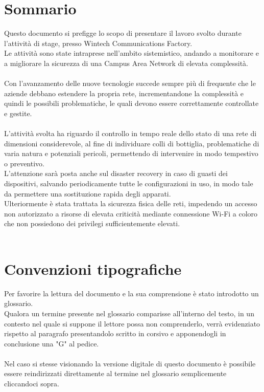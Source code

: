 \documentclass[Tesi.tex]{subfiles}
\begin{document}
\clearpage\thispagestyle{empty}
	
\renewcommand{\chaptername}{}
\renewcommand{\thechapter}{}
\chapter{Sommario}
Questo documento si prefigge lo scopo di presentare il lavoro svolto durante l'attività di stage, presso Wintech Communications Factory. \\
Le attività sono state intraprese nell'ambito sistemistico, andando a monitorare e a migliorare la sicurezza di una Campus Area Network di elevata complessità. \\\\

Con l'avanzamento delle nuove tecnologie succede sempre più di frequente che le aziende debbano estendere la propria rete, incrementandone la complessità e quindi le possibili problematiche, le quali devono essere correttamente controllate e gestite. \\\\
L'attività svolta ha riguardo il controllo in tempo reale dello stato di una rete di dimensioni considerevole, al fine di individuare colli di bottiglia, problematiche di varia natura e potenziali pericoli, permettendo di intervenire in modo tempestivo o preventivo.\\
L'attenzione sarà posta anche sul disaster recovery in caso di guasti dei dispositivi, salvando periodicamente tutte le configurazioni in uso, in modo tale da permettere una sostituzione rapida degli apparati. \\
Ulteriormente è stata trattata la sicurezza fisica delle reti, impedendo un accesso non autorizzato a risorse di elevata criticità mediante connessione Wi-Fi a coloro che non possiedono dei privilegi sufficientemente elevati. \\\\


\newpage
\chapter{Convenzioni tipografiche}
Per favorire la lettura del documento e la sua comprensione è stato introdotto un glossario. \\
Qualora un termine presente nel glossario comparisse all'interno del testo, in un contesto nel quale si suppone il lettore possa non comprenderlo, verrà evidenziato rispetto al paragrafo presentandolo scritto in corsivo e apponendogli in conclusione una "G" al pedice. \\\\
Nel caso si stesse visionando la versione digitale di questo documento è possibile essere reindirizzati direttamente al termine nel glossario semplicemente cliccandoci sopra. \\


\clearpage
\end{document}
